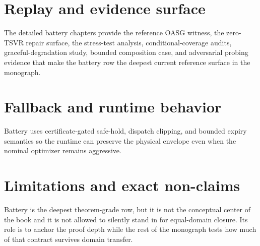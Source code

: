 \section{Replay and evidence surface}
The detailed battery chapters provide the reference OASG witness, the zero-TSVR repair
surface, the stress-test analysis, conditional-coverage audits, graceful-degradation study,
bounded composition case, and adversarial probing evidence that make the battery row the
deepest current reference surface in the monograph.

\section{Fallback and runtime behavior}
Battery uses certificate-gated safe-hold, dispatch clipping, and bounded expiry semantics so
the runtime can preserve the physical envelope even when the nominal optimizer remains
aggressive.

\section{Limitations and exact non-claims}
Battery is the deepest theorem-grade row, but it is not the conceptual center of the book
and it is not allowed to silently stand in for equal-domain closure.  Its role is to anchor
the proof depth while the rest of the monograph tests how much of that contract survives
domain transfer.
